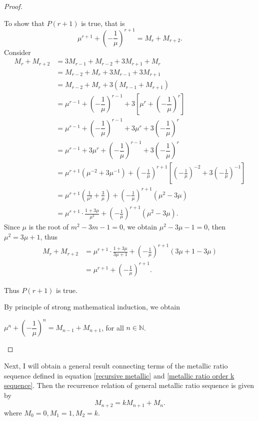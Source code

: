 \documentclass{rmutt-seminar}
\begin{document}
\begin{proof}
\begin{enumerate}[label=(\roman*),leftmargin = 1.5cm]
To show that $P(r+1)$ is true, that is
$$ \mu^{r+1} + \left(-\dfrac{1}{\mu}\right)^{r+1}= M_{r} + M_{r+2}. $$  
 Consider
 \begin{align*}
	M_{r} + M_{r+2} &= 3M_{r-1} + M_{r-2} + 3M_{r+1} + M_r \\
	&= M_{r-2} + M_r + 3M_{r-1} + 3M_{r+1} \\
	&= M_{r-2} + M_r + 3(M_{r-1} + M_{r+1}) \\
	&= \mu^{r-1} + \left(-\dfrac{1}{\mu}\right)^{r-1} +3\left[\mu^{r} + \left(-\dfrac{1}{\mu}\right)^{r} \right]\\
	&= \mu^{r-1} + \left(-\dfrac{1}{\mu}\right)^{r-1} +3\mu^{r} + 3\left(-\dfrac{1}{\mu}\right)^{r} \\
	&= \mu^{r-1} + 3\mu^{r} + \left(-\dfrac{1}{\mu}\right)^{r-1} + 3\left(-\dfrac{1}{\mu}\right)^{r} \\
	&= \mu^{r+1}(\mu^{-2} + 3\mu^{-1}) + \left(-\frac{1}{\mu}\right)^{r+1} \left[ \left(-\frac{1}{\mu}\right)^{-2} + 3\left(-\frac{1}{\mu}\right)^{-1}\right] \\
	&= \mu^{r+1} \left(\frac{1}{\mu^2} + \frac{3}{\mu}\right) + \left(-\frac{1}{\mu}\right)^{r+1}(\mu^2-3\mu) \\
	&= \mu^{r+1} \cdot \frac{1+3\mu}{\mu^2}+\left(-\frac{1}{\mu}\right)^{r+1}(\mu^2-3\mu).
\end{align*}
Since $\mu$ is the root of $m^2 -3m -1 =0$, we obtain $\mu^2-3\mu-1=0$, then $\mu^2 = 3\mu + 1$, thus
 \begin{align*}
 M_{r} + M_{r+2} &= \mu^{r+1} \cdot \frac{1+3\mu}{3\mu+1}+\left(-\frac{1}{\mu}\right)^{r+1}(3\mu+1-3\mu)\\
 &= \mu^{r+1}+\left(-\frac{1}{\mu}\right)^{r+1}.
 \end{align*}	
 
 Thus $P(r+1)$ is true.
 
By principle of strong mathematical induction, we obtain 
\begin{center}
$\mu^n + \left(-\dfrac{1}{\mu}\right)^n = M_{n-1} + M_{n+1} $, for all $n \in \mathbb{N}$.
\end{center}
\end{enumerate}
\end{proof}

Next, I will obtain a general result connecting terms of the metallic ratio sequence defined in equation \eqref{recursive metallic} and 
\eqref{metallic ratio order k sequence}. Then the recurrence relation of general metallic ratio sequence is given by
\begin{equation*}
	 M_{n+2} =kM_{n+1}+M_n.
\end{equation*}  
where $M_0=0, M_1=1, M_2=k.$
\newline
\end{document}
